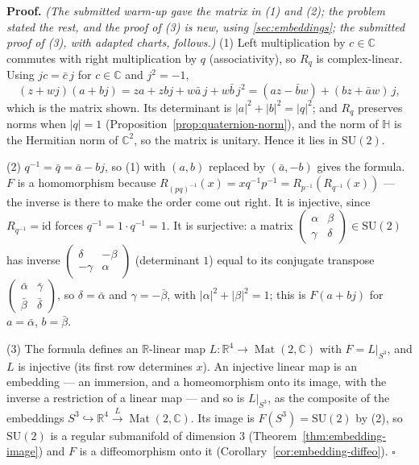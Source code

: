 \documentclass[11pt]{report}
\renewenvironment{proof}[1][Proof]{\noindent\textbf{#1.} }{\hfill$\square$\par\vspace{5pt}}
\DeclareMathOperator{\Mat}{Mat}
\begin{document}
\begin{proof}
\textit{(The submitted warm-up gave the matrix in (1) and (2); the problem stated the rest, and the proof of (3) is new, using \ref{sec:embeddings}; the submitted proof of (3), with adapted charts, follows.)} (1) Left multiplication by $c \in \mathbb{C}$ commutes with right multiplication by $q$ (associativity), so $R_q$ is complex-linear. Using $jc = \bar c\, j$ for $c \in \mathbb{C}$ and $j^2 = -1$,
\[
(z + wj)(a + bj) = za + zbj + w\bar a\, j + w \bar b\, j^2 = (az - \bar b w) + (bz + \bar a w)\, j ,
\]
which is the matrix shown. Its determinant is $|a|^2 + |b|^2 = |q|^2$; and $R_q$ preserves norms when $|q| = 1$ (Proposition~\ref{prop:quaternion-norm}), and the norm of $\mathbb{H}$ is the Hermitian norm of $\mathbb{C}^2$, so the matrix is unitary. Hence it lies in $\mathrm{SU}(2)$.

(2) $q^{-1} = \bar q = \bar a - bj$, so (1) with $(a, b)$ replaced by $(\bar a, -b)$ gives the formula. $F$ is a homomorphism because $R_{(pq)^{-1}}(x) = x q^{-1} p^{-1} = R_{p^{-1}}(R_{q^{-1}}(x))$ --- the inverse is there to make the order come out right. It is injective, since $R_{q^{-1}} = \mathrm{id}$ forces $q^{-1} = 1 \cdot q^{-1} = 1$. It is surjective: a matrix $\begin{pmatrix} \alpha & \beta \\ \gamma & \delta \end{pmatrix} \in \mathrm{SU}(2)$ has inverse $\begin{pmatrix} \delta & -\beta \\ -\gamma & \alpha \end{pmatrix}$ (determinant $1$) equal to its conjugate transpose $\begin{pmatrix} \bar\alpha & \bar\gamma \\ \bar\beta & \bar\delta \end{pmatrix}$, so $\delta = \bar\alpha$ and $\gamma = -\bar\beta$, with $|\alpha|^2 + |\beta|^2 = 1$; this is $F(a + bj)$ for $a = \bar\alpha$, $b = \bar\beta$.

(3) The formula defines an $\mathbb{R}$-linear map $L : \mathbb{R}^4 \to \Mat(2, \mathbb{C})$ with $F = L|_{S^3}$, and $L$ is injective (its first row determines $x$). An injective linear map is an embedding --- an immersion, and a homeomorphism onto its image, with the inverse a restriction of a linear map --- and so is $L|_{S^3}$, as the composite of the embeddings $S^3 \hookrightarrow \mathbb{R}^4 \xrightarrow{L} \Mat(2, \mathbb{C})$. Its image is $F(S^3) = \mathrm{SU}(2)$ by (2), so $\mathrm{SU}(2)$ is a regular submanifold of dimension $3$ (Theorem~\ref{thm:embedding-image}) and $F$ is a diffeomorphism onto it (Corollary~\ref{cor:embedding-diffeo}).
\end{proof}
\end{document}
